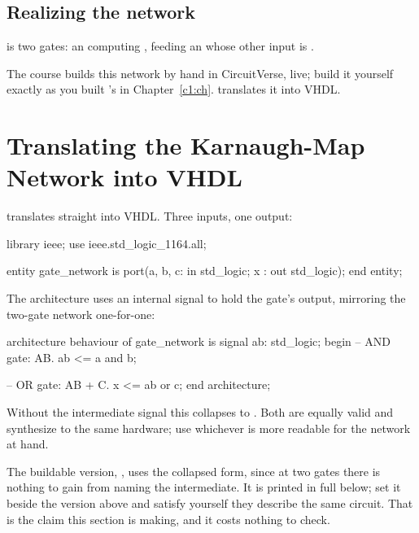 \subsection{Realizing the network}
\label{c2:kmapnetwork}
 is two gates: an  computing , feeding an  whose other
input is .


\noindent The course builds this network by hand in CircuitVerse, live; build it yourself exactly as
you built 's in Chapter~\ref{c1:ch}.  translates it into VHDL.

\section{Translating the Karnaugh-Map Network into VHDL}
\label{c2:a2}
 translates straight into VHDL. Three inputs, one output:

\begin{vhdlcode}
library ieee;
use ieee.std_logic_1164.all;

entity gate_network is
    port(a, b, c: in std_logic;
         x      : out std_logic);
end entity;
\end{vhdlcode}

\noindent The architecture uses an internal signal  to hold the  gate's output,
mirroring the two-gate network one-for-one:

\begin{vhdlcode}
architecture behaviour of gate_network is
signal ab: std_logic;
begin
    -- AND gate: AB.
    ab <= a and b;

    -- OR gate: AB + C.
    x <= ab or c;
end architecture;
\end{vhdlcode}

\noindent Without the intermediate signal this collapses to . Both are
equally valid and synthesize to the same hardware; use whichever is more readable for the network at
hand.

The buildable version, , uses the collapsed form,
since at two gates there is nothing to gain from naming the intermediate. It is printed in full
below; set it beside the version above and satisfy yourself they describe the same circuit. That is
the claim this section is making, and it costs nothing to check.


